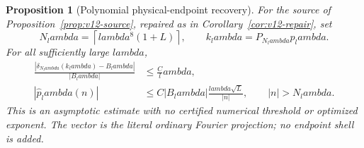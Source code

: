 \documentclass[11pt]{article}
\def\lambda{lambda}%
\newtheorem{proposition}[theorem]{Proposition}
\theoremstyle{remark}
\begin{document}
\begin{proposition}[Polynomial physical-endpoint recovery]
\label{prop:v114-polynomial-endpoint}
For the source of Proposition~\ref{prop:v12-source}, repaired as in
Corollary~\ref{cor:v12-repair}, set
\[
 N_\lambda=\left\lceil\lambda^8(1+L)\right\rceil,
       \qquad k_\lambda=P_{N_\lambda}p_\lambda.
\]
For all sufficiently large $\lambda$,
\begin{align}
 \frac{|\delta_{N_\lambda}(k_\lambda)-B_\lambda|}{|B_\lambda|}
       &\le\frac C\lambda,\label{eq:v114-polynomial-endpoint}\\
 |\widehat p_\lambda(n)|
       &\le C|B_\lambda|\frac{\lambda\sqrt L}{|n|},
            \qquad |n|>N_\lambda.\label{eq:v114-high-tail}
\end{align}
This is an asymptotic estimate with no certified numerical threshold or
optimized exponent. The vector is the literal ordinary Fourier projection;
no endpoint shell is added.
\end{proposition}
\end{document}
